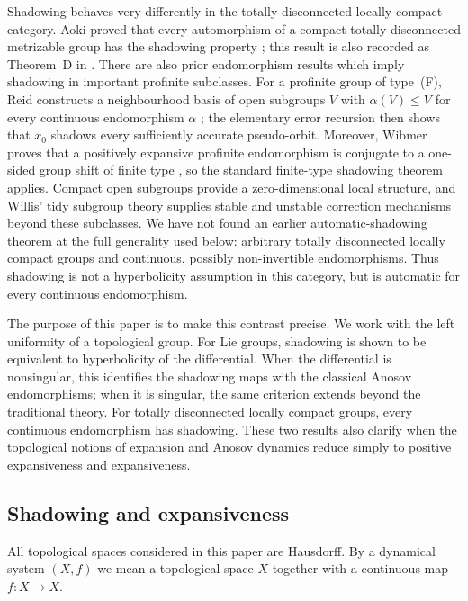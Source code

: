 \documentclass[12pt]{amsart}
\theoremstyle{definition}
\numberwithin{equation}{section}
\theoremstyle{remark}
\begin{document}
Shadowing behaves very differently in the totally disconnected locally
compact category. Aoki proved that every automorphism of a compact totally
disconnected metrizable group has the shadowing property
\cite[Application~2, pp.~170--172]{AokiSplitting1985}; this result is also recorded as Theorem~D in
\cite{AokiDense1985}. There are also prior endomorphism results which imply
shadowing in important profinite subclasses. For a profinite group of
type~(F), Reid constructs a neighbourhood basis of open subgroups $V$ with
$\alpha(V)\leq V$ for every continuous endomorphism $\alpha$
\cite[Definition~3.1 and Proposition~3.2]{Reid2014}; the elementary error
recursion then shows that $x_0$ shadows every sufficiently accurate
pseudo-orbit. Moreover, Wibmer proves that a positively expansive profinite
endomorphism is conjugate to a one-sided group shift of finite type
\cite[Proposition~2.1 and Lemma~3.3]{Wibmer2022}, so the standard finite-type
shadowing theorem applies. Compact open subgroups provide a zero-dimensional
local structure, and Willis' tidy subgroup theory supplies stable and
unstable correction mechanisms beyond these subclasses. We have not found
an earlier automatic-shadowing theorem at the full generality used below:
arbitrary totally disconnected locally compact groups and continuous,
possibly non-invertible endomorphisms. Thus shadowing is not a hyperbolicity
assumption in this category, but is automatic for every continuous
endomorphism.

The purpose of this paper is to make this contrast precise. We work with
the left uniformity of a topological group. For Lie groups, shadowing is
shown to be equivalent to hyperbolicity of the differential. When the
differential is nonsingular, this identifies the shadowing maps with the
classical Anosov endomorphisms; when it is singular, the same criterion
extends beyond the traditional theory. For totally disconnected locally
compact groups, every continuous endomorphism has shadowing. These two
results also clarify when the topological notions of expansion and Anosov
dynamics reduce simply to positive expansiveness and expansiveness.

\subsection{Shadowing and expansiveness}

All topological spaces considered in this paper are Hausdorff. By a
dynamical system $(X,f)$ we mean a topological space $X$ together with a
continuous map $f:X\to X$.
\end{document}

